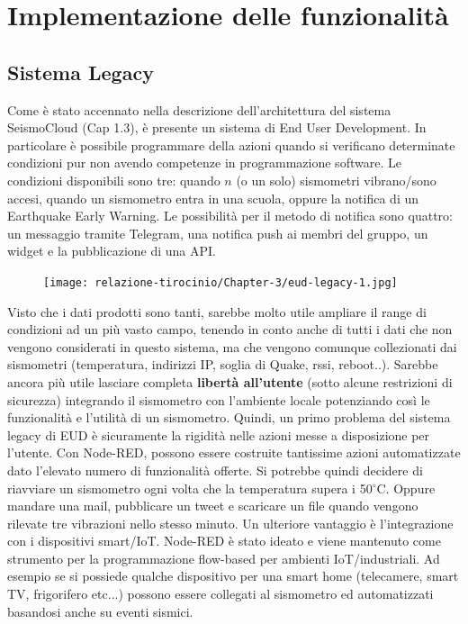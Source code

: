 \documentclass[a4paper,10pt]{memoir}
\begin{document}
\chapter{Implementazione delle funzionalità}

\section{Sistema Legacy}

Come è stato accennato nella descrizione dell'architettura del sistema SeismoCloud (Cap 1.3), è presente un sistema di End User Development. In particolare è possibile programmare della azioni quando si verificano determinate condizioni pur non avendo competenze in programmazione software.
Le condizioni disponibili sono tre: quando $n$ (o un solo) sismometri vibrano/sono accesi, quando un sismometro entra in una scuola, oppure la notifica di un Earthquake Early Warning.
Le possibilità per il metodo di notifica sono quattro: un messaggio tramite Telegram, una notifica push ai membri del gruppo, un widget e la pubblicazione di una API.
\begin{figure}[ht]
\label{legacy1}
\texttt{[image: relazione-tirocinio/Chapter-3/eud-legacy-1.jpg]}
\end{figure}
Visto che i dati prodotti sono tanti, sarebbe molto utile ampliare il range di condizioni ad un più vasto campo, tenendo in conto anche di tutti i dati che non vengono considerati in questo sistema, ma che vengono comunque collezionati dai sismometri (temperatura, indirizzi IP, soglia di Quake, rssi, reboot..).
Sarebbe ancora più utile lasciare completa \textbf{libertà all'utente} (sotto alcune restrizioni di sicurezza) integrando il sismometro con l'ambiente locale potenziando così le funzionalità e l'utilità di un sismometro.
Quindi, un primo problema del sistema legacy di EUD è sicuramente la rigidità nelle azioni messe a disposizione per l'utente.
Con Node-RED, possono essere costruite tantissime azioni automatizzate dato l'elevato numero di funzionalità offerte.
Si potrebbe quindi decidere di riavviare un sismometro ogni volta che la temperatura supera i 50$^{\circ}$C. Oppure mandare una mail, pubblicare un tweet e scaricare un file quando vengono rilevate tre vibrazioni nello stesso minuto.
Un ulteriore vantaggio è l'integrazione con i dispositivi smart/IoT. Node-RED è stato ideato e viene mantenuto come strumento per la programmazione flow-based per ambienti IoT/industriali. Ad esempio se si possiede qualche dispositivo per una smart home (telecamere, smart TV, frigorifero etc...) possono essere collegati al sismometro ed automatizzati basandosi anche su eventi sismici.
\end{document}
